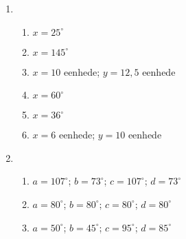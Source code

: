 {\begin{multicols}{3}
\begin{enumerate}[noitemsep, label=\textbf{\arabic*}.]
\begin{enumerate}[noitemsep, label=\textbf{(\alph*)} ]
\item V%
\item W%
\item W%
\item V%
\item W%
\item W%
\item W%
\item V%
\item V%
	  \end{enumerate}
      \item %
	  \begin{enumerate}[noitemsep, label=\textbf{(\alph*)} ]
	\item $x=25^{\circ}$
\item $x=145^{\circ}$
\item $x=10$ eenhede; $y=12,5$ eenhede
\item $x=60^{\circ}$
\item $x=36^{\circ}$
\item $x=6$ eenhede; $y=10$ eenhede
	  \end{enumerate}

\setcounter{enumi}{4}
      \item %
	  \begin{enumerate}[noitemsep, label=\textbf{(\alph*)} ]
		\item $a=107^{\circ}$; $ b=73^{\circ}$; $c=107^{\circ}$; $d=73^{\circ}$
\item $a=80^{\circ}$; $b=80^{\circ}$; $c=80^{\circ}$; $d=80^{\circ}$
\item $a=50^{\circ}$; $ b=45^{\circ}$; $c=95^{\circ}$; $ d=85^{\circ}$
	  \end{enumerate}


\end{enumerate}
\end{multicols}}

